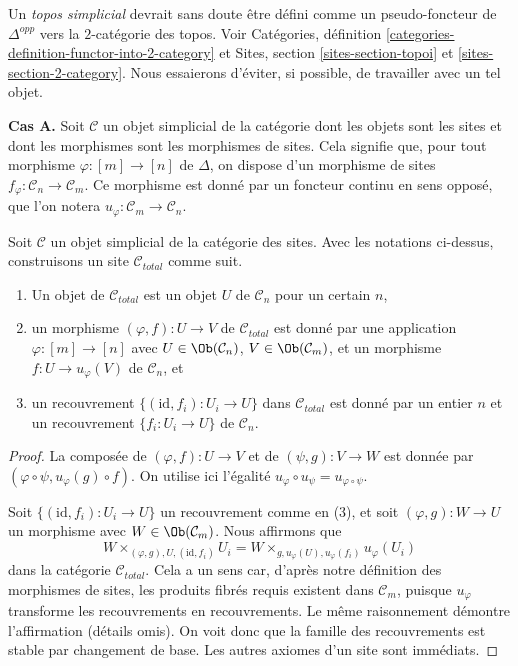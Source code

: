 \medskip\noindent
Un {\it topos simplicial} devrait sans doute être défini comme un
pseudo-foncteur de $\Delta^{opp}$ vers la $2$-catégorie des topos.
Voir Catégories, définition \ref{categories-definition-functor-into-2-category}
et Sites, section \ref{sites-section-topoi} et
\ref{sites-section-2-category}. Nous essaierons d'éviter, si possible,
de travailler avec un tel objet.

\medskip\noindent
{\bf Cas A.}
Soit $\mathcal{C}$ un objet simplicial de la catégorie dont les objets
sont les sites et dont les morphismes sont les morphismes de sites. Cela signifie que,
pour tout morphisme $\varphi : [m] \to [n]$ de $\Delta$, on dispose d'un morphisme
de sites $f_\varphi : \mathcal{C}_n \to \mathcal{C}_m$. Ce morphisme est
donné par un foncteur continu en sens opposé, que l'on notera
$u_\varphi : \mathcal{C}_m \to \mathcal{C}_n$.

\begin{lemma}
\label{lemma-simplicial-site-site}
Soit $\mathcal{C}$ un objet simplicial de la catégorie des sites.
Avec les notations ci-dessus, construisons un site $\mathcal{C}_{total}$ comme suit.
\begin{enumerate}
\item Un objet de $\mathcal{C}_{total}$ est un objet $U$ de
$\mathcal{C}_n$ pour un certain $n$,
\item un morphisme $(\varphi, f) : U \to V$ de $\mathcal{C}_{total}$
est donné par une application $\varphi : [m] \to [n]$ avec
$U \in \Ob(\mathcal{C}_n)$, $V \in \Ob(\mathcal{C}_m)$,
et un morphisme $f : U \to u_\varphi(V)$ de $\mathcal{C}_n$, et
\item un recouvrement $\{(\text{id}, f_i) :  U_i \to U\}$ dans $\mathcal{C}_{total}$
est donné par un entier $n$ et un recouvrement $\{f_i : U_i \to U\}$
de $\mathcal{C}_n$.
\end{enumerate}
\end{lemma}

\begin{proof}
La composée de $(\varphi, f) : U \to V$ et de $(\psi, g) : V \to W$
est donnée par $(\varphi \circ \psi, u_\varphi(g) \circ f)$.
On utilise ici l'égalité $u_\varphi \circ u_\psi = u_{\varphi \circ \psi}$.

\medskip\noindent
Soit $\{(\text{id}, f_i) :  U_i \to U\}$ un recouvrement comme en (3),
et soit $(\varphi, g) : W \to U$ un morphisme avec
$W \in \Ob(\mathcal{C}_m)$. Nous affirmons que
$$
W \times_{(\varphi, g), U, (\text{id}, f_i)} U_i =
W \times_{g, u_\varphi(U), u_\varphi(f_i)} u_\varphi(U_i)
$$
dans la catégorie $\mathcal{C}_{total}$. Cela a un sens car, d'après notre
définition des morphismes de sites, les produits fibrés requis
existent dans $\mathcal{C}_m$, puisque $u_\varphi$ transforme les recouvrements en
recouvrements. Le même raisonnement démontre l'affirmation (détails omis).
On voit donc que la famille des recouvrements est stable par changement
de base. Les autres axiomes d'un site sont immédiats.
\end{proof}

